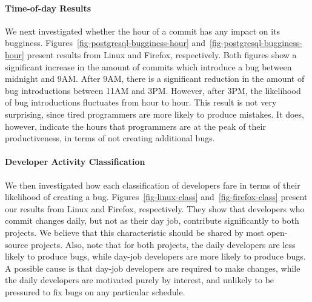 \paragraph{Time-of-day Results} We next investigated whether the hour of a commit has any impact on
its bugginess. Figures~\ref{fig-postgresql-bugginess-hour} and~\ref{fig-postgresql-bugginess-hour}
present results from Linux and Firefox, respectively. Both figures
show a significant increase in the amount of commits which introduce a
bug between midnight and 9AM. After 9AM, there is a significant
reduction in the amount of bug introductions between 11AM and 3PM.
However, after 3PM, the likelihood of bug introductions fluctuates
from hour to hour. This result is not very surprising, since tired
programmers are more likely to produce mistakes. It does, however,
indicate the hours that programmers are at the peak of their
productiveness, in terms of not creating additional bugs.



\paragraph{Developer Activity Classification} 
We then investigated how each classification of developers fare in
terms of their likelihood of creating a
bug. Figures~\ref{fig-linux-class} and~\ref{fig-firefox-class} present
our results from Linux and Firefox, respectively.  They show that
developers who commit changes daily, but not as their day job,
contribute significantly to both projects. We believe that this
characteristic should be shared by most open-source projects. Also,
note that for both projects, the daily developers are less likely to
produce bugs, while day-job developers
are more likely to produce bugs. %
A possible cause is that day-job developers are required to make changes,
while the daily developers are motivated purely by interest, and
unlikely to be pressured to fix bugs on any particular schedule.

